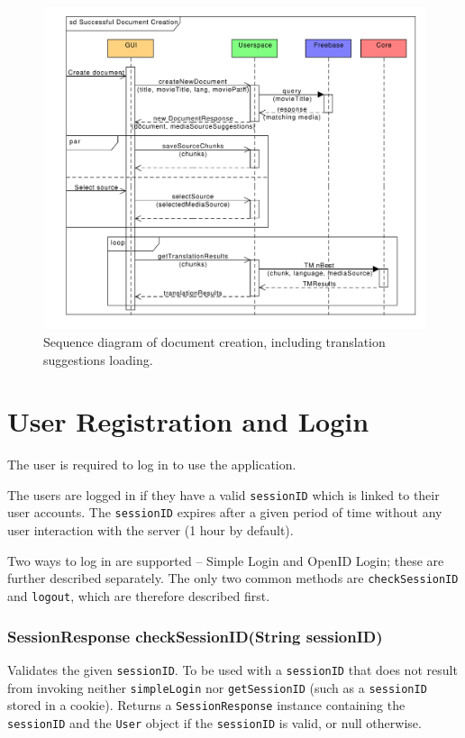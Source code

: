 \begin{figure}[h]
\begin{center}
\includegraphics[scale=0.65]{figures/document_creation_sequence_RPC.pdf}
\end{center}
\caption{Sequence diagram of document creation, including translation suggestions loading.}\label{rpc:sd:document_creation}
\end{figure}

\section{User Registration and Login}
\label{sec:rpc:login}

The user is required to log in to use the application.

The users are logged in if they have a valid {\tt sessionID} which is linked to their user accounts.
The {\tt sessionID} expires after a given period of time without any user interaction with the server (1 hour by default).

Two ways to log in are supported -- Simple Login and OpenID Login; these are further described separately. The only two common methods are {\tt checkSessionID} and {\tt logout}, which are therefore described first.

\subsubsection{SessionResponse checkSessionID(String sessionID)}
Validates the given {\tt sessionID}. To be used with a {\tt sessionID} that does not result from invoking neither {\tt simpleLogin} nor {\tt getSessionID} (such as a {\tt sessionID} stored in a cookie).
Returns a {\tt SessionResponse} instance containing the {\tt sessionID} and the {\tt User} object if the {\tt sessionID} is valid, or null otherwise.

